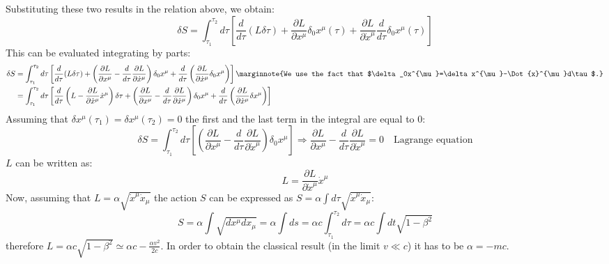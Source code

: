 \documentclass[../main.tex]{subfiles}
\begin{document}
Substituting these two results in the relation above, we obtain:
\[
\delta S=\int_{\tau_1}^{\tau_2}d\tau\left[\frac{d}{d\tau}(L\delta\tau)+\frac{\partial L}{\partial x^{\mu}}\delta_0x^{\mu}(\tau)+\frac{\partial L}{\partial\Dot{x}^{\mu}}\frac{d}{d\tau}\delta_0x^{\mu}(\tau)\right]
\]
This can be evaluated integrating by parts:
\begin{align*}
    \delta S&=\int_{\tau_1}^{\tau_2}d\tau\left[\frac{d}{d\tau}(L\delta\tau)+\left(\frac{\partial L}{\partial x^{\mu}}-\frac{d}{d\tau}\frac{\partial L}{\partial\Dot{x}^{\mu}}\right)\delta_0x^{\mu}+\frac{d}{d\tau}\left(\frac{\partial L}{\partial\Dot{x}^{\mu}}\delta_0x^{\mu}\right)\right]\marginnote{We use the fact that $\delta_0x^{\mu}=\delta x^{\mu}-\Dot{x}^{\mu}d\tau$.}\\
    &=\int_{\tau_1}^{\tau_2}d\tau\left[\frac{d}{d\tau}\left(L-\frac{\partial L}{\partial\Dot{x}^{\mu}}\Dot{x}^{\mu}\right)\delta\tau+\left(\frac{\partial L}{\partial x^{\mu}}-\frac{d}{d\tau}\frac{\partial L}{\partial\Dot{x}^{\mu}}\right)\delta_0x^{\mu}+\frac{d}{d\tau}\left(\frac{\partial L}{\partial\Dot{x}^{\mu}}\delta x^{\mu}\right)\right]
\end{align*}
Assuming that $\delta x^{\mu}(\tau_1)=\delta x^{\mu}(\tau_2)=0$ the first and the last term in the integral are equal to 0:
\[
\delta S=\int_{\tau_1}^{\tau_2}d\tau\left[\left(\frac{\partial L}{\partial x^{\mu}}-\frac{d}{d\tau}\frac{\partial L}{\partial\Dot{x}^{\mu}}\right)\delta_0x^{\mu}\right]\Rightarrow\frac{\partial L}{\partial x^{\mu}}-\frac{d}{d\tau}\frac{\partial L}{\partial\Dot{x}^{\mu}}=0 \quad \text{Lagrange equation}
\]
$L$ can be written as: 
\[
L=\frac{\partial L}{\partial\Dot{x}^{\mu}}\Dot{x}^{\mu}
\]
Now, assuming that $L=\alpha\sqrt{\Dot{x}^{\mu}\Dot{x}_{\mu}}$ the action $S$ can be expressed as $S=\alpha\int d\tau\sqrt{\Dot{x}^{\mu}\Dot{x}_{\mu}}$:
\[
S=\alpha\int\sqrt{dx^{\mu}dx_{\mu}}=\alpha\int ds=\alpha c\int_{\tau_1}^{\tau_2}d\tau=\alpha c\int dt\sqrt{1-\beta^2}
\]
therefore $L=\alpha c\sqrt{1-\beta^2}\simeq\alpha c-\frac{\alpha v^2}{2c}$. In order to obtain the classical result (in the limit $v\ll c$) it has to be $\alpha=-mc$.
\end{document}
